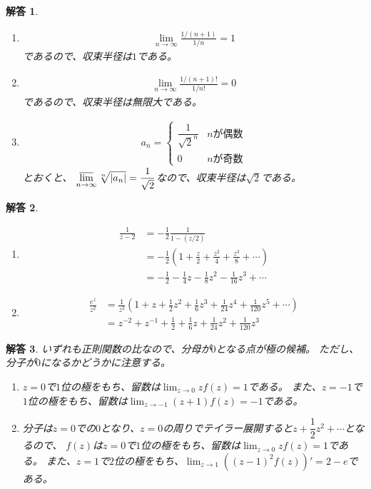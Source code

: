 \documentclass{ltjsarticle}
\newtheorem{ans}{解答}
\begin{document}
\begin{ans}
    \begin{enumerate}
        \item \begin{align*}\lim_{n\to\infty}\frac{1/(n+1)}{1/n}=1\end{align*}であるので、収束半径は$1$である。
        \item \begin{align*}\lim_{n\to\infty}\frac{1/(n+1)!}{1/n!}=0\end{align*}であるので、収束半径は無限大である。
        \item \begin{align*}a_n=\begin{cases}\dfrac{1}{\sqrt{2}^n}&n\mbox{が偶数}\\0&n\mbox{が奇数}\end{cases}\end{align*}とおくと、
            $\displaystyle\varlimsup_{n\to\infty}\sqrt[n]{\lvert a_n\rvert}=\dfrac{1}{\sqrt{2}}$なので、収束半径は$\sqrt{2}$である。
    \end{enumerate}
\end{ans}

\begin{ans}
    \begin{enumerate}
        \item 
            \begin{align*}
                \frac{1}{z-2}&=-\frac{1}{2}\frac{1}{1-(z/2)}\\
                &=-\frac{1}{2}(1+\frac{z}{2}+\frac{z^2}{4}+\frac{z^3}{8}+\cdots)\\
                &=-\frac{1}{2}-\frac{1}{4}z-\frac{1}{8}z^2-\frac{1}{16}z^3+\cdots
            \end{align*}
        \item
            \begin{align*}
                \frac{e^z}{z^2}&=\frac{1}{z^2}(1+z+\frac{1}{2}z^2+\frac{1}{6}z^3+\frac{1}{24}z^4+\frac{1}{120}z^5+\cdots)\\
                &=z^{-2}+z^{-1}+\frac{1}{2}+\frac{1}{6}z+\frac{1}{24}z^2+\frac{1}{120}z^3
            \end{align*}
    \end{enumerate}
\end{ans}

\begin{ans}
    いずれも正則関数の比なので、分母が$0$となる点が極の候補。
    ただし、分子が$0$になるかどうかに注意する。
    \begin{enumerate}
        \item $z=0$で$1$位の極をもち、留数は$\displaystyle\lim_{z\to0}zf(z)=1$である。
        また、$z=-1$で$1$位の極をもち、留数は$\displaystyle\lim_{z\to-1}(z+1)f(z)=-1$である。
        \item 分子は$z=0$での$0$となり、$z=0$の周りでテイラー展開すると$z+\dfrac{1}{2}z^2+\cdots$となるので、
        $f(z)$は$z=0$で$1$位の極をもち、留数は$\displaystyle\lim_{z\to0}zf(z)=1$である。
        また、$z=1$で$2$位の極をもち、$\displaystyle\lim_{z\to1}((z-1)^2f(z))'=2-e$である。
    \end{enumerate}
\end{ans}
\end{document}
